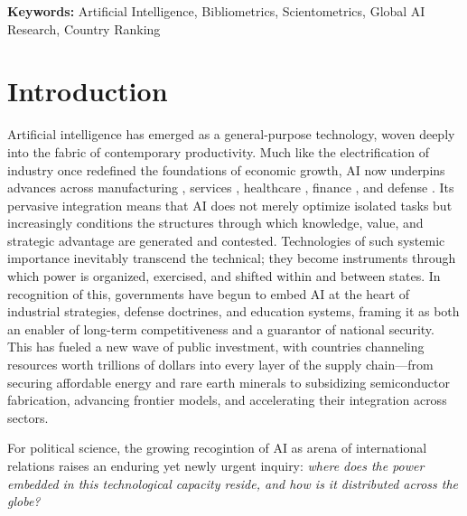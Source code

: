 \documentclass{article}
\begin{document}
\vspace{2cm} %

\begin{flushleft}

\hspace*{1cm}\textbf{Keywords:} Artificial Intelligence, Bibliometrics, Scientometrics, Global AI Research, Country Ranking



\end{flushleft}

\newpage

\tableofcontents
\thispagestyle{empty}
\newpage


\twocolumn

\section{Introduction}
\setcounter{page}{1}

Artificial intelligence has emerged as a general-purpose technology, woven deeply into the fabric of contemporary productivity. Much like the electrification of industry once redefined the foundations of economic growth, AI now underpins advances across manufacturing \cite{kim2022recent}, services \cite{huang2018artificial}, healthcare \cite{alkuwaiti2023review}, finance \cite{bahoo2024artificial}, and defense \cite{sabouri2024newgeopolitics} \cite{vance2023geopolitical}. Its pervasive integration means that AI does not merely optimize isolated tasks but increasingly conditions the structures through which knowledge, value, and strategic advantage are generated and contested. Technologies of such systemic importance inevitably transcend the technical; they become instruments through which power is organized, exercised, and shifted within and between states. In recognition of this, governments have begun to embed AI at the heart of industrial strategies, defense doctrines, and education systems, framing it as both an enabler of long-term competitiveness and a guarantor of national security. This has fueled a new wave of public investment, with countries channeling resources worth trillions of dollars into every layer of the supply chain—from securing affordable energy and rare earth minerals to subsidizing semiconductor fabrication, advancing frontier models, and accelerating their integration across sectors.

For political science, the growing recogintion of AI as arena of international relations raises an enduring yet newly urgent inquiry: \emph{where does the power embedded in this technological capacity reside, and how is it distributed across the globe?}
\end{document}
